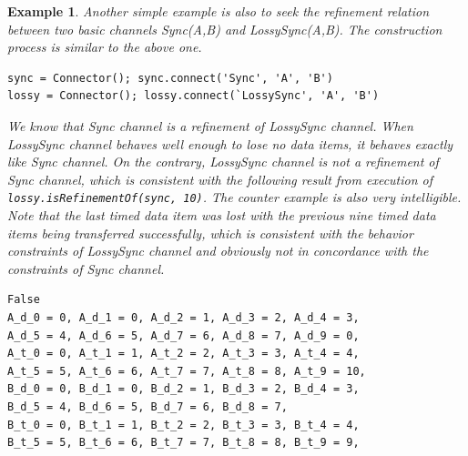 \documentclass[preprint,3p]{elsarticle}
\newtheorem{example}{Example}[section]
\begin{document}
\begin{example}
Another simple example is also to seek the refinement relation between two basic channels \emph{Sync(A,B)} and \emph{LossySync(A,B)}. The construction process is similar to the above one.
\begin{lstlisting}
sync = Connector(); sync.connect('Sync', 'A', 'B')
lossy = Connector(); lossy.connect(`LossySync', 'A', 'B')
\end{lstlisting}
We know that \emph{Sync} channel is a refinement of \emph{LossySync} channel. When \emph{LossySync} channel behaves well enough to lose no data items, it behaves exactly like \emph{Sync} channel. On the contrary, \emph{LossySync} channel is not a refinement of \emph{Sync} channel, which is consistent with the following result from execution of \texttt{lossy.isRefinementOf(sync, 10)}. The counter example is also very intelligible. Note that the last timed data item was lost with the previous nine timed data items being transferred successfully, which is consistent with the behavior constraints of \emph{LossySync} channel and obviously not in concordance with the constraints of \emph{Sync} channel.
\begin{lstlisting}
False
A_d_0 = 0, A_d_1 = 0, A_d_2 = 1, A_d_3 = 2, A_d_4 = 3,
A_d_5 = 4, A_d_6 = 5, A_d_7 = 6, A_d_8 = 7, A_d_9 = 0,
A_t_0 = 0, A_t_1 = 1, A_t_2 = 2, A_t_3 = 3, A_t_4 = 4,
A_t_5 = 5, A_t_6 = 6, A_t_7 = 7, A_t_8 = 8, A_t_9 = 10,
B_d_0 = 0, B_d_1 = 0, B_d_2 = 1, B_d_3 = 2, B_d_4 = 3,
B_d_5 = 4, B_d_6 = 5, B_d_7 = 6, B_d_8 = 7,
B_t_0 = 0, B_t_1 = 1, B_t_2 = 2, B_t_3 = 3, B_t_4 = 4,
B_t_5 = 5, B_t_6 = 6, B_t_7 = 7, B_t_8 = 8, B_t_9 = 9,
\end{lstlisting}
\end{example}
\end{document}
